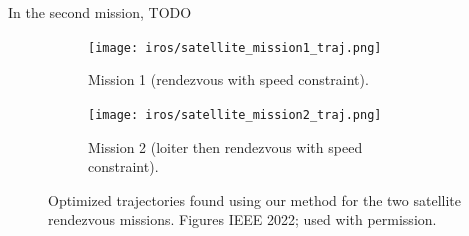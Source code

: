 In the second mission, TODO

\begin{figure}[tbh]
    \centering
    \begin{subfigure}[c]{0.45\linewidth}
        \centering
        \texttt{[image: iros/satellite\_mission1\_traj.png]}
        \caption{Mission 1 (rendezvous with speed constraint).}
        \label{ch:iros:fig:mission_1_traj}
    \end{subfigure}
    \quad
    \begin{subfigure}[c]{0.45\linewidth}
        \centering
        \texttt{[image: iros/satellite\_mission2\_traj.png]}
        \caption{Mission 2 (loiter then rendezvous with speed constraint).}
        \label{ch:iros:fig:mission_2_traj}
    \end{subfigure}
    \caption{Optimized trajectories found using our method for the two satellite rendezvous missions. Figures \textcopyright IEEE 2022; used with permission.}
\end{figure}

